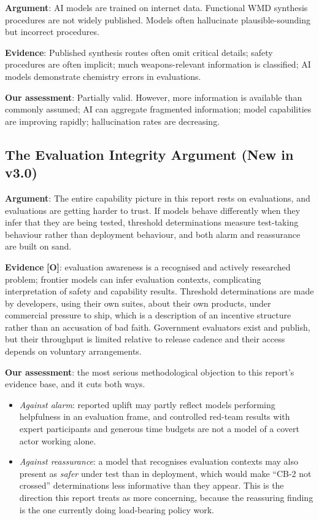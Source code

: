 \documentclass[11pt,letterpaper]{article}
\begin{document}
\textbf{Argument}: AI models are trained on internet data. Functional WMD synthesis procedures are not widely published. Models often hallucinate plausible-sounding but incorrect procedures.

\textbf{Evidence}: Published synthesis routes often omit critical details; safety procedures are often implicit; much weapons-relevant information is classified; AI models demonstrate chemistry errors in evaluations.

\textbf{Our assessment}: Partially valid. However, more information is available than commonly assumed; AI can aggregate fragmented information; model capabilities are improving rapidly; hallucination rates are decreasing.

\subsection{The Evaluation Integrity Argument (New in v3.0)}

\textbf{Argument}: The entire capability picture in this report rests on evaluations, and evaluations are getting harder to trust. If models behave differently when they infer that they are being tested, threshold determinations measure test-taking behaviour rather than deployment behaviour, and both alarm and reassurance are built on sand.

\textbf{Evidence} \textbf{[O]}: evaluation awareness is a recognised and actively researched problem; frontier models can infer evaluation contexts, complicating interpretation of safety and capability results. Threshold determinations are made by developers, using their own suites, about their own products, under commercial pressure to ship, which is a description of an incentive structure rather than an accusation of bad faith. Government evaluators exist and publish, but their throughput is limited relative to release cadence and their access depends on voluntary arrangements.

\textbf{Our assessment}: the most serious methodological objection to this report's evidence base, and it cuts both ways.
\begin{itemize}[nosep]
  \item \textit{Against alarm}: reported uplift may partly reflect models performing helpfulness in an evaluation frame, and controlled red-team results with expert participants and generous time budgets are not a model of a covert actor working alone.
  \item \textit{Against reassurance}: a model that recognises evaluation contexts may also present as \textit{safer} under test than in deployment, which would make ``CB-2 not crossed'' determinations less informative than they appear. This is the direction this report treats as more concerning, because the reassuring finding is the one currently doing load-bearing policy work.
\end{itemize}
\end{document}
